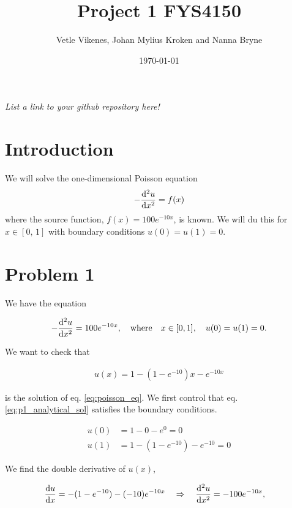 \documentclass[english,notitlepage,nofootinbib]{revtex4-1}  %
\begin{document}
\title{Project 1 FYS4150} 
\author{Vetle Vikenes, Johan Mylius Kroken and Nanna Bryne}      
\date{\today}                 
\noaffiliation       

\maketitle 
    
\textit{List a link to your github repository here!}
    
\section*{Introduction}
We will solve the one-dimensional Poisson equation 
\begin{align*}
    - \dv[2]{u}{x}=f(x)
\end{align*}
where the source function, $f(x)=100e^{-10x}$, is known. We will du this for $x\in[0,\,1]$ with boundary conditions $u(0)=u(1)=0$.

\section*{Problem 1}

We have the equation 

\begin{align}\label{eq:poisson_eq}
    -\dv[2]{u}{x} =  100e^{-10x}, \quad \text{where} \quad x\in [0,1], \quad u(0)=u(1)=0.
\end{align}


We want to check that 

\begin{align}\label{eq:p1_analytical_sol}
    u(x) = 1 - (1-e^{-10})x - e^{-10x}
\end{align}

is the solution of eq. \ref{eq:poisson_eq}. We first control that eq. \ref{eq:p1_analytical_sol} satisfies the boundary conditions. 

\begin{align*}
    u(0) &= 1 - 0 - e^{0} = 0 \\
    u(1) &= 1 - (1-e^{-10}) - e^{-10} = 0
\end{align*}
 
We find the double derivative of $u(x)$,

\begin{align*}
    \dv{u}{x} &= -(1-e^{-10}) - (-10)e^{-10x} \quad \Rightarrow \quad \dv[2]{u}{x} = -100e^{-10x},
\end{align*}
\end{document}
